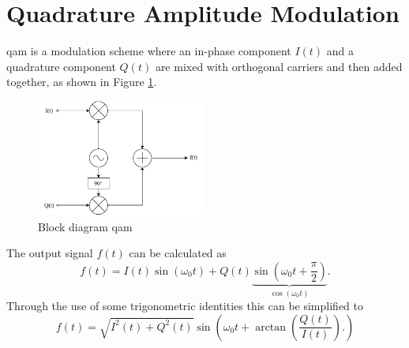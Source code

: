 \section{Quadrature Amplitude Modulation}\label{2_QAM_sec:QAM}
\acrfull{qam} \cite{nat_skript} is a modulation scheme where an in-phase component $I(t)$ and a quadrature component $Q(t)$ are mixed with orthogonal carriers and then added together, as shown in Figure \ref{2_fig:qam_diagram}. 
\begin{figure}[h!]
    \centering
    \includegraphics[width=0.5\textwidth]{images/2_Preliminaries/QAM.pdf}
    \caption{Block diagram \acrshort{qam}}
    \label{2_fig:qam_diagram}
\end{figure}

The output signal $f(t)$ can be calculated as 
\begin{equation}
    f(t) = I(t) \sin \left ( \omega_0 t\right ) + Q(t)\underbrace{\sin \left ( \omega_0 t + \frac{\pi}{2} \right)}_{\cos{(\omega_0 t)}}.
\end{equation}
Through the use of some trigonometric identities this can be simplified to 
\begin{equation}
    f(t) = \sqrt{I^2(t) + Q^2(t)} \sin{\left(\omega_0 t + \arctan{ \left ( \frac{Q(t)}{I(t)} \right )}. \right )}
\end{equation}
